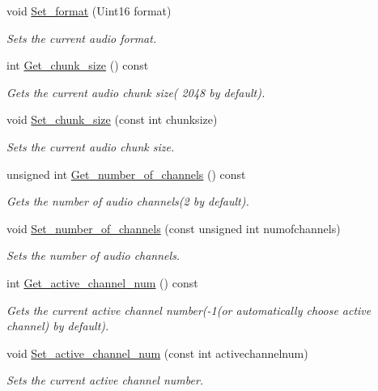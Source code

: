 \begin{DoxyCompactItemize}
void \hyperlink{classjetfuel_1_1media_1_1Sound_ac764c3156841b6bd2970d912292ac1ca}{Set\+\_\+format} (Uint16 format)
\begin{DoxyCompactList}\small\item\em Sets the current audio format. \end{DoxyCompactList}\item 
int \hyperlink{classjetfuel_1_1media_1_1Sound_a8f1cbbaaf31a106938968f256e77bad7}{Get\+\_\+chunk\+\_\+size} () const
\begin{DoxyCompactList}\small\item\em Gets the current audio chunk size( 2048 by default). \end{DoxyCompactList}\item 
void \hyperlink{classjetfuel_1_1media_1_1Sound_ad84439e1a101e298b2e5186851ebe0d3}{Set\+\_\+chunk\+\_\+size} (const int chunksize)
\begin{DoxyCompactList}\small\item\em Sets the current audio chunk size. \end{DoxyCompactList}\item 
unsigned int \hyperlink{classjetfuel_1_1media_1_1Sound_a0fe4e0c72224935e14a5481435e855af}{Get\+\_\+number\+\_\+of\+\_\+channels} () const
\begin{DoxyCompactList}\small\item\em Gets the number of audio channels(2 by default). \end{DoxyCompactList}\item 
void \hyperlink{classjetfuel_1_1media_1_1Sound_ac0bb67c175f71ab5977af3f5781cedd7}{Set\+\_\+number\+\_\+of\+\_\+channels} (const unsigned int numofchannels)
\begin{DoxyCompactList}\small\item\em Sets the number of audio channels. \end{DoxyCompactList}\item 
int \hyperlink{classjetfuel_1_1media_1_1Sound_afcef9fca1204403d6f3d52fc4b494463}{Get\+\_\+active\+\_\+channel\+\_\+num} () const
\begin{DoxyCompactList}\small\item\em Gets the current active channel number(-\/1(or automatically choose active channel) by default). \end{DoxyCompactList}\item 
void \hyperlink{classjetfuel_1_1media_1_1Sound_addaea461cf050aa23501882b2c76b39b}{Set\+\_\+active\+\_\+channel\+\_\+num} (const int activechannelnum)
\begin{DoxyCompactList}\small\item\em Sets the current active channel number. \end{DoxyCompactList}\item 

\end{DoxyCompactItemize}

